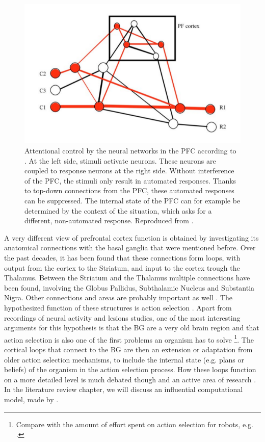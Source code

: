 \documentclass[10pt,a4paper]{report}
\begin{document}
\begin{figure}[bthp]
\begin{center}
\includegraphics[scale=0.5]{figures/MillerCohen2001.png}
\caption{Attentional control by the neural networks in the PFC according to \citet{Miller2001}. At the left side, stimuli activate neurons. These neurons are coupled to response neurons at the right side. Without interference of the PFC, the stimuli only result in automated responses. Thanks to top-down connections from the PFC, these automated responses can be suppressed. The internal state of the PFC can for example be determined by the context of the situation, which asks for a different, non-automated response. Reproduced from \citet{Miller2001}. }
\label{MillerCohen}
\end{center} 
\end{figure}

\label{loops}
A very different view of prefrontal cortex function is obtained by investigating its anatomical connections with the basal ganglia that were mentioned before. Over the past decades, it has been found that these connections form loops, with output from the cortex to the Striatum, and input to the cortex trough the Thalamus. Between the Striatum and the Thalamus multiple connections have been found, involving the Globus Pallidus, Subthalamic Nucleus and Substantia Nigra. Other connections and areas are probably important as well \citep{Parent1995}. The hypothesized function of these structures is action selection \citep{Bogacz2007}. Apart from recordings of neural activity and lesions studies, one of the most interesting arguments for this hypothesis is that the BG are a very old brain region and that action selection is also one of the first problems an organism has to solve \citep{Redgrave1999} \footnote{Compare with the amount of effort spent on action selection for robots, e.g. \citet{Yamada1999}.}. The cortical loops that connect to the BG are then an extension or adaptation from older action selection mechanisms, to include the internal state (e.g. plans or beliefs) of the organism in the action selection process. How these loops function on a more detailed level is much debated though and an active area of research \citep{Prescott2006, Hazy2007}. In the literature review chapter, we will discuss an influential computational model, made by \citet{O'Reilly2006}. 
\end{document}

